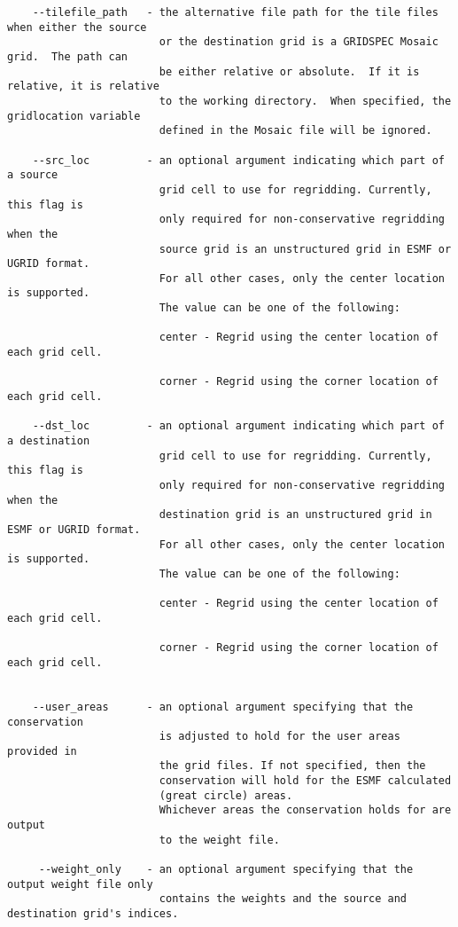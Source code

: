 \begin{verbatim}
    --tilefile_path   - the alternative file path for the tile files when either the source
                        or the destination grid is a GRIDSPEC Mosaic grid.  The path can
                        be either relative or absolute.  If it is relative, it is relative
                        to the working directory.  When specified, the gridlocation variable
                        defined in the Mosaic file will be ignored. 
                
    --src_loc         - an optional argument indicating which part of a source
                        grid cell to use for regridding. Currently, this flag is 
                        only required for non-conservative regridding when the 
                        source grid is an unstructured grid in ESMF or UGRID format.
                        For all other cases, only the center location is supported.
                        The value can be one of the following:

                        center - Regrid using the center location of each grid cell.

                        corner - Regrid using the corner location of each grid cell.

    --dst_loc         - an optional argument indicating which part of a destination
                        grid cell to use for regridding. Currently, this flag is 
                        only required for non-conservative regridding when the 
                        destination grid is an unstructured grid in ESMF or UGRID format.
                        For all other cases, only the center location is supported.
                        The value can be one of the following:

                        center - Regrid using the center location of each grid cell.

                        corner - Regrid using the corner location of each grid cell.


    --user_areas      - an optional argument specifying that the conservation
                        is adjusted to hold for the user areas provided in
                        the grid files. If not specified, then the 
                        conservation will hold for the ESMF calculated 
                        (great circle) areas.
                        Whichever areas the conservation holds for are output
                        to the weight file.

     --weight_only    - an optional argument specifying that the output weight file only 
                        contains the weights and the source and destination grid's indices.


\end{verbatim}
